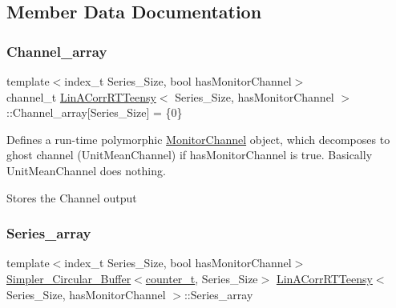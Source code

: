 \subsection{Member Data Documentation}
\mbox{\label{classLinACorrRTTeensy_a3276cb9bb215af9676edc35958c889b8}} 
\subsubsection{\texorpdfstring{Channel\+\_\+array}{Channel\_array}}
{\footnotesize\ttfamily template$<$index\+\_\+t Series\+\_\+\+Size, bool has\+Monitor\+Channel$>$ \\
channel\+\_\+t \hyperlink{classLinACorrRTTeensy}{Lin\+A\+Corr\+R\+T\+Teensy}$<$ Series\+\_\+\+Size, has\+Monitor\+Channel $>$\+::Channel\+\_\+array\mbox{[}Series\+\_\+\+Size\mbox{]} = \{0\}}



Defines a run-\/time polymorphic \hyperlink{classMonitorChannel}{Monitor\+Channel} object, which decomposes to {\ttfamily ghost} channel (Unit\+Mean\+Channel) if {\ttfamily has\+Monitor\+Channel} is true. Basically {\ttfamily Unit\+Mean\+Channel} does nothing. 

Stores the Channel output \mbox{\label{classLinACorrRTTeensy_a5c4cc1fe032812d6290579c7c8b22e57}} 
\subsubsection{\texorpdfstring{Series\+\_\+array}{Series\_array}}
{\footnotesize\ttfamily template$<$index\+\_\+t Series\+\_\+\+Size, bool has\+Monitor\+Channel$>$ \\
\hyperlink{classSimpler__Circular__Buffer}{Simpler\+\_\+\+Circular\+\_\+\+Buffer}$<$\hyperlink{types_8hpp_a22f279793847eba127de149437848c48}{counter\+\_\+t}, Series\+\_\+\+Size$>$ \hyperlink{classLinACorrRTTeensy}{Lin\+A\+Corr\+R\+T\+Teensy}$<$ Series\+\_\+\+Size, has\+Monitor\+Channel $>$\+::Series\+\_\+array}



